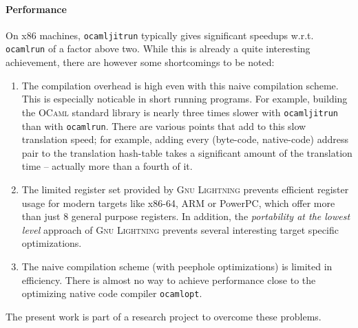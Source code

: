 \documentclass[10pt,a4paper,twocolumn]{article}
\begin{document}
\paragraph{Performance}

On x86 machines, \texttt{ocamljitrun} typically gives significant
speedups w.r.t. \texttt{ocamlrun} of a factor above two. While this is already a quite
interesting achievement, there are however some shortcomings to be noted:
\begin{enumerate}
\item The compilation overhead is high even with this naive compilation scheme. This is
  especially noticable in short running programs. For example, building the \textsc{OCaml}
  standard library is nearly three times slower with \texttt{ocamljitrun} than with
  \texttt{ocamlrun}. There are various points that add to this slow translation speed; for
  example, adding every (byte-code, native-code) address pair to the translation
  hash-table takes a significant amount of the translation time -- actually more than a fourth
  of it\cite{Starynkevitch04}.
\item The limited register set provided by \textsc{Gnu Lightning} prevents efficient register
  usage for modern targets like x86-64, ARM or PowerPC, which offer more than just 8 general
  purpose registers. In addition, the \emph{portability at the lowest level} approach of
  \textsc{Gnu Lightning} prevents several interesting target specific optimizations.
\item The naive compilation scheme (with peephole optimizations) is limited in efficiency. There
  is almost no way to achieve performance close to the optimizing native code compiler \texttt{ocamlopt}.
\end{enumerate}
The present work is part of a research project to overcome these problems. 



\end{document}
